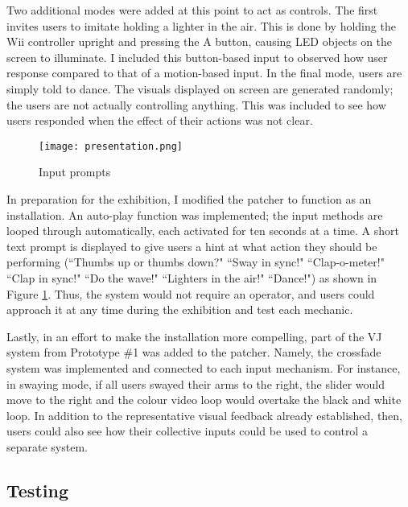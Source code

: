 Two additional modes were added at this point to act as controls. The first invites users to imitate holding a lighter in the air. This is done by holding the Wii controller upright and pressing the A button, causing LED objects on the screen to illuminate. I included this button-based input to observed how user response compared to that of a motion-based input. In the final mode, users are simply told to dance. The visuals displayed on screen are generated randomly; the users are not actually controlling anything. This was included to see how users responded when the effect of their actions was not clear.

\begin{figure}
	\centering

	\texttt{[image: presentation.png]}
	\caption{Input prompts}

	\label{prototyping2.3}
\end{figure}

In preparation for the exhibition, I modified the patcher to function as an installation. An auto-play function was implemented; the input methods are looped through automatically, each activated for ten seconds at a time. A short text prompt is displayed to give users a hint at what action they should be performing (``Thumbs up or thumbs down?" ``Sway in sync!" ``Clap-o-meter!" ``Clap in sync!" ``Do the wave!" ``Lighters in the air!" ``Dance!") as shown in Figure \ref{prototyping2.3}. Thus, the system would not require an operator, and users could approach it at any time during the exhibition and test each mechanic.

Lastly, in an effort to make the installation more compelling, part of the VJ system from Prototype \#1 was added to the patcher. Namely, the crossfade system was implemented and connected to each input mechanism. For instance, in swaying mode, if all users swayed their arms to the right, the slider would move to the right and the colour video loop would overtake the black and white loop. In addition to the representative visual feedback already established, then, users could also see how their collective inputs could be used to control a separate system.

\subsection{Testing}

